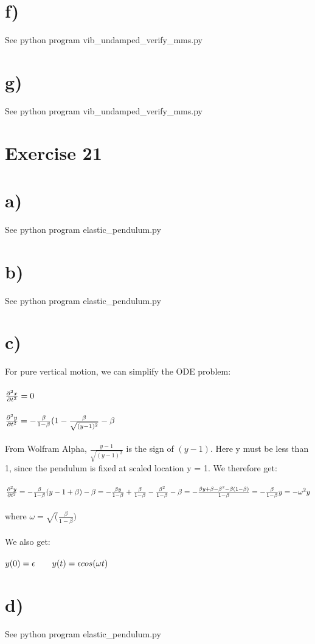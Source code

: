 \documentclass[a4paper,english,11pt,twoside]{article}
\newcommand{\tab}{\hspace*{2em}}
\begin{document}
\section*{f)}
 See python program vib\_undamped\_verify\_mms.py

\section*{g)}
 See python program vib\_undamped\_verify\_mms.py
\newpage
\section*{Exercise 21}
\section*{a)}
See python program elastic\_pendulum.py
\section*{b)}
See python program elastic\_pendulum.py
\section*{c)}
For pure vertical motion, we can simplify the ODE problem:\\
\\
$\frac{\partial^2 x}{\partial t^2} = 0$\\
\\
$\frac{\partial^2 y}{\partial t^2} = -\frac{\beta}{1 - \beta}(1 - \frac{\beta}{\sqrt{(y - 1)^2}} - \beta$\\
\\
From Wolfram Alpha, $\frac{y-1}{\sqrt{(y - 1)^2}}$ is the sign of $(y-1)$. Here y must be less than 1, since the pendulum is fixed at scaled location y = 1. We therefore get:\\
\\
$\frac{\partial^2 y}{\partial t^2} = -\frac{\beta}{1 - \beta}(y - 1 + \beta) - \beta = -\frac{\beta y}{1 - \beta} + \frac{\beta}{1 - \beta} - \frac{\beta^2}{1-\beta} - \beta = -\frac{\beta y + \beta - \beta^2 - \beta(1 - \beta)}{1 - \beta} = -\frac{\beta}{1 - \beta}y = -\omega^2y$\\
\\
where $\omega = \sqrt(\frac{\beta}{1-\beta})$\\
\\
We also get:\\
\\
$y(0) = \epsilon\tab y(t) = \epsilon cos(\omega t)$
\section*{d)}
See python program elastic\_pendulum.py
 
\end{document}
